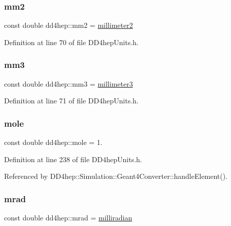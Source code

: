 \subsubsection{\texorpdfstring{mm2}{mm2}}
{\footnotesize\ttfamily const double dd4hep\+::mm2 = \hyperlink{namespacedd4hep_a1096fbca749064ac09ed44d5a2b37599}{millimeter2}\hspace{0.3cm}{\ttfamily [static]}}



Definition at line 70 of file D\+D4hep\+Units.\+h.

\hypertarget{namespacedd4hep_a7ca8a76450060a8f0aa5a0fe68a56b1b}{}\label{namespacedd4hep_a7ca8a76450060a8f0aa5a0fe68a56b1b} 
\subsubsection{\texorpdfstring{mm3}{mm3}}
{\footnotesize\ttfamily const double dd4hep\+::mm3 = \hyperlink{namespacedd4hep_a2ea09df717c3b153b6ea78fbd517fddc}{millimeter3}\hspace{0.3cm}{\ttfamily [static]}}



Definition at line 71 of file D\+D4hep\+Units.\+h.

\hypertarget{namespacedd4hep_a09193b4505440f7f2a58f02fbea9120f}{}\label{namespacedd4hep_a09193b4505440f7f2a58f02fbea9120f} 
\subsubsection{\texorpdfstring{mole}{mole}}
{\footnotesize\ttfamily const double dd4hep\+::mole = 1.\hspace{0.3cm}{\ttfamily [static]}}



Definition at line 238 of file D\+D4hep\+Units.\+h.



Referenced by D\+D4hep\+::\+Simulation\+::\+Geant4\+Converter\+::handle\+Element().

\hypertarget{namespacedd4hep_acc4b11e3d4313ca95a536c6467087bb1}{}\label{namespacedd4hep_acc4b11e3d4313ca95a536c6467087bb1} 
\subsubsection{\texorpdfstring{mrad}{mrad}}
{\footnotesize\ttfamily const double dd4hep\+::mrad = \hyperlink{namespacedd4hep_a7502a4a65dcbf4395be335d0ba214a82}{milliradian}\hspace{0.3cm}{\ttfamily [static]}}



